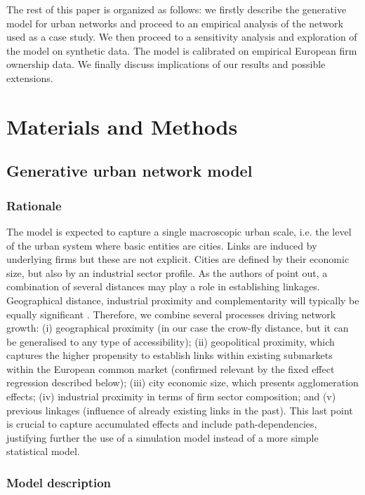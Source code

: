 \documentclass[10pt,letterpaper]{article}
\begin{document}
The rest of this paper is organized as follows: we firstly describe the generative model for urban networks and proceed to an empirical analysis of the network used as a case study. We then proceed to a sensitivity analysis and exploration of the model on synthetic data. The model is calibrated on empirical European firm ownership data. We finally discuss implications of our results and possible extensions.

\section*{Materials and Methods}

\subsection*{Generative urban network model}

\subsubsection*{Rationale}

The model is expected to capture a single macroscopic urban scale, i.e. the level of the urban system where basic entities are cities. Links are induced by underlying firms but these are not explicit. Cities are defined by their economic size, but also by an industrial sector profile. As the authors of \cite{martinus2018global} point out, a combination of several distances may play a role in establishing linkages. Geographical distance, industrial proximity and complementarity will typically be equally significant \cite{cottineau2020nested}. Therefore, we combine several processes driving network growth: (i) geographical proximity (in our case the crow-fly distance, but it can be generalised to any type of accessibility); (ii) geopolitical proximity, which captures the higher propensity to establish links within existing submarkets within the European common market (confirmed relevant by the fixed effect regression described below); (iii) city economic size, which presents agglomeration effects; (iv) industrial proximity in terms of firm sector composition; and (v) previous linkages (influence of already existing links in the past). This last point is crucial to capture accumulated effects and include path-dependencies, justifying further the use of a simulation model instead of a more simple statistical model.


\subsubsection*{Model description}
\end{document}
